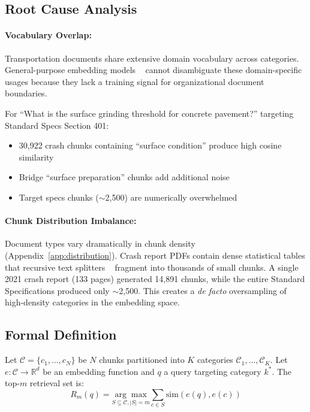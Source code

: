 \documentclass{article}
\begin{document}
\subsection{Root Cause Analysis}

\paragraph{Vocabulary Overlap:} Transportation documents share extensive domain vocabulary across categories. 
General-purpose embedding models ~\citep{reimers2019sentencebert, wang2024e5mistral} cannot disambiguate these domain-specific usages because they lack a training signal for organizational document boundaries.

For ``What is the surface grinding threshold for concrete pavement?'' targeting Standard Specs Section 401:
\begin{itemize}[leftmargin=*,topsep=2pt,itemsep=1pt]
    \item 30,922 crash chunks containing ``surface condition'' produce high cosine similarity
    \item Bridge ``surface preparation'' chunks add additional noise
    \item Target specs chunks ($\sim$2,500) are numerically overwhelmed
\end{itemize}

\paragraph{Chunk Distribution Imbalance:} Document types vary dramatically in chunk density (Appendix~\ref{app:distribution}). Crash report PDFs contain dense statistical tables that recursive text splitters ~\citep{langchain2024recursive} fragment into thousands of small chunks. A single 2021 crash report (133 pages) generated 14,891 chunks, while the entire Standard Specifications produced only $\sim$2,500. This creates a \textit{de facto} oversampling of high-density categories in the embedding space.

\subsection{Formal Definition}

Let $\mathcal{C} = \{c_1, \ldots, c_N\}$ be $N$ chunks partitioned into $K$ categories $\mathcal{C}_1, \ldots, \mathcal{C}_K$. Let $e: \mathcal{C} \rightarrow \mathbb{R}^d$ be an embedding function and $q$ a query targeting category $k^*$. The top-$m$ retrieval set is:
\begin{equation}
R_m(q) = \underset{S \subseteq \mathcal{C}, |S|=m}{\arg\max} \sum_{c \in S} \text{sim}(e(q), e(c))
\end{equation}
\end{document}

